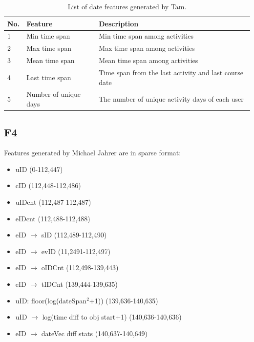\begin{center}
	\begin{table}[ht]
		\begin{minipage}{\textwidth}
			{
				\small
				\hfill{}
				\begin{tabular}{|l|l|l|}
					\hline
					\textbf{No.}&\textbf{Feature}&\textbf{Description}\tabularnewline \hline
					1 & Min time span & Min time span among activities \tabularnewline
					2 & Max time span & Max time span among activities \tabularnewline
					3 & Mean time span & Mean time span among activities \tabularnewline
					4 & Last time span & Time span from the last activity and last course date \tabularnewline
					5 & Number of unique days & The number of unique activity days of each user
					\hline
				\end{tabular}
			}
			\hfill{}
			\caption{List of date features generated by Tam.}
			\label{tb:tnfeature3}
		\end{minipage}
	\end{table}
\end{center}

\subsection{F4}
Features generated by Michael Jahrer are in sparse format:

\begin{itemize}
  \setlength\itemsep{0em}
  \item uID (0-112,447)
  \item cID (112,448-112,486)
  \item uIDcnt (112,487-112,487)
  \item eIDcnt (112,488-112,488)
  \item eID $\rightarrow$ sID (112,489-112,490)
  \item eID $\rightarrow$ evID (11,2491-112,497)
  \item eID $\rightarrow$ oIDCnt (112,498-139,443)
  \item eID $\rightarrow$ tIDCnt (139,444-139,635)
  \item uID: floor(log(dateSpan$^2$+1)) (139,636-140,635)
  \item uID $\rightarrow$ log(time diff to obj start+1) (140,636-140,636)
  \item eID $\rightarrow$ dateVec diff stats (140,637-140,649)
\end{itemize}

